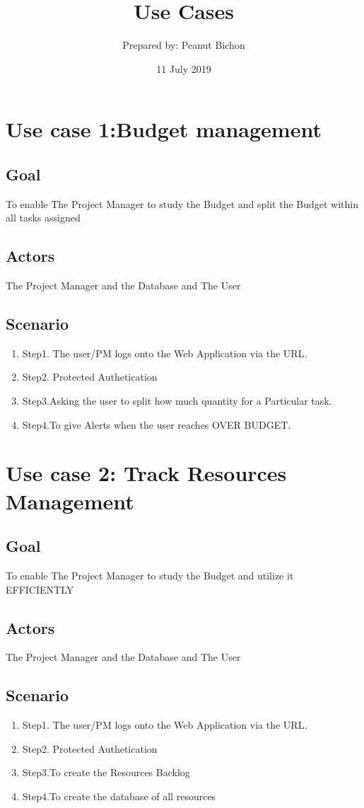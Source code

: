 \documentclass[10pt]{article}
\title{Use Cases}
\author{Prepared by: Peanut Bichon}
\date{ 11 July 2019}
\begin{document}
\maketitle
\tableofcontents
\section*{Use case 1:Budget management}
\subsection{Goal}
To enable The Project Manager to study the Budget and split the Budget within all tasks assigned
\subsection{Actors}
The Project Manager and the Database and The User 
\subsection{Scenario}
\begin{enumerate}
\item Step1. The user/PM logs onto the Web Application via the URL.
\item Step2. Protected Authetication
\item Step3.Asking the user to split how much quantity for a Particular task.
\item Step4.To give Alerts when the user reaches OVER BUDGET.
\end{enumerate}


\section*{Use case 2: Track Resources Management}
\subsection{Goal}
To enable The Project Manager to study the Budget and utilize it EFFICIENTLY
\subsection{Actors}
The Project Manager and the Database and The User 
\subsection{Scenario}
\begin{enumerate}
\item Step1. The user/PM logs onto the Web Application via the URL.
\item Step2. Protected Authetication
\item Step3.To create the Resources Backlog
\item Step4.To create the database of all resources 
\end{enumerate}
\end{document}
